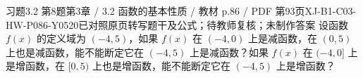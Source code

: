 \par\noindent\begin{minipage}{\linewidth}
\begin{bankitem}{习题3.2 第8题}{第3章 / 3.2 函数的基本性质 / 教材 p.86 / PDF 第93页}{XJ-B1-C03-HW-P086-Y0520}{已对照原页转写题干及公式；待教师复核；未制作答案}
设函数 $f(x)$ 的定义域为 $(-4,5)$，如果 $f(x)$ 在 $(-4,0)$ 上是减函数，在 $(0,5)$ 上也是减函数，能不能断定它在 $(-4,5)$ 上是减函数？如果 $f(x)$ 在 $(-4,0]$ 上是增函数，在 $[0,5)$ 上也是增函数，能不能断定它在 $(-4,5)$ 上是增函数？
\end{bankitem}
\end{minipage}\par\medskip
